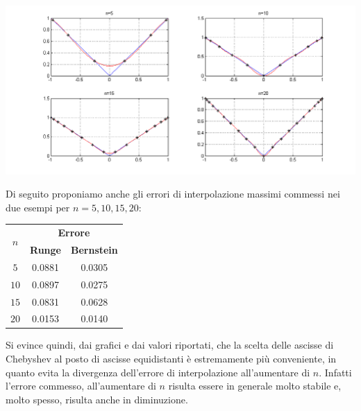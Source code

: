 \begin{sol}
\begin{itemize}
\begin{center}
			\end{center}
			\begin{center}
				\includegraphics[scale=0.4]{img/es4_15d.png}
			\end{center}
	\end{itemize}
	Di seguito proponiamo anche gli errori di interpolazione massimi commessi nei due esempi per $n=5,10,15,20$:
	\begin{center}
		\begin{tabular}{c||c|c}
			\multirow{2}{*}{$n$} & \multicolumn{2}{|c}{\textbf{Errore}}\\
			& \textbf{Runge} & \textbf{Bernstein}\\
			\hline
			$5$ & 0.0881 & 0.0305\\
			$10$ & 0.0897 & 0.0275\\
			$15$ & 0.0831 & 0.0628\\
			$20$ & 0.0153 & 0.0140
		\end{tabular}
	\end{center}
	Si evince quindi, dai grafici e dai valori riportati,
	che la scelta delle ascisse di Chebyshev al posto di ascisse equidistanti è estremamente più conveniente,
	in quanto evita la divergenza dell'errore di interpolazione all'aumentare di $n$. Infatti l'errore commesso,
	all'aumentare di $n$ risulta essere in generale molto stabile e, molto spesso, risulta anche in diminuzione.

	

\end{sol}


